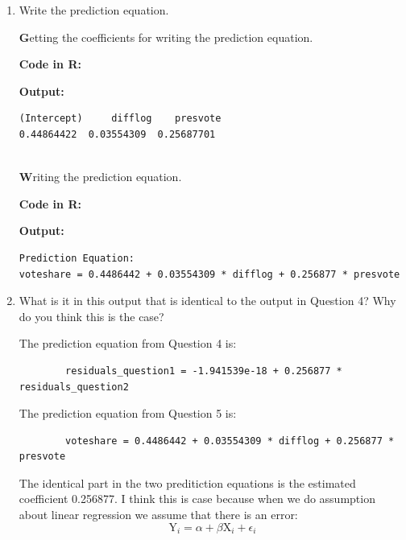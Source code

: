 \documentclass[12pt,letterpaper]{article}
\begin{document}
\begin{enumerate}
		\item Write the prediction equation.	\vspace{0.5cm}
		
		\noindent \textbf Getting the coefficients for writing the prediction equation. \vspace{0.5cm}
		
		\noindent \textbf{Code in R:}
		  
		\vspace{.25cm}
		
		\noindent \textbf{Output: }
		\begin{verbatim}
(Intercept)     difflog    presvote  
0.44864422  0.03554309  0.25687701 
			
		\end{verbatim}  
		\vspace{.25cm}
	
		\noindent \textbf Writing the prediction equation. 
		\vspace{0.5cm}	
		
		\noindent \textbf{Code in R:}
		  
		\vspace{.25cm}
		
		\noindent \textbf{Output: }
		\begin{verbatim}
Prediction Equation: 
voteshare = 0.4486442 + 0.03554309 * difflog + 0.256877 * presvote
		\end{verbatim}  
		\vspace{1 cm}
		
		\item What is it in this output that is identical to the output in Question 4? Why do you think this is the case?  \vspace{0.5cm}
		
		\noindent The prediction equation from Question 4 is: 
					\begin{verbatim}
		residuals_question1 = -1.941539e-18 + 0.256877 * residuals_question2
	\end{verbatim}  
		
		The prediction equation from Question 5 is: 
			\begin{verbatim}
		voteshare = 0.4486442 + 0.03554309 * difflog + 0.256877 * presvote
	\end{verbatim}  
	
	\noindent The identical part in the two preditiction equations is the estimated coefficient 0.256877. I think this is case because when we do assumption about linear regression we assume that there is an error:
	$$ \text{Y}_i = \alpha + \beta \text{X}_i + \epsilon_i $$
	

\end{enumerate}
\end{document}

